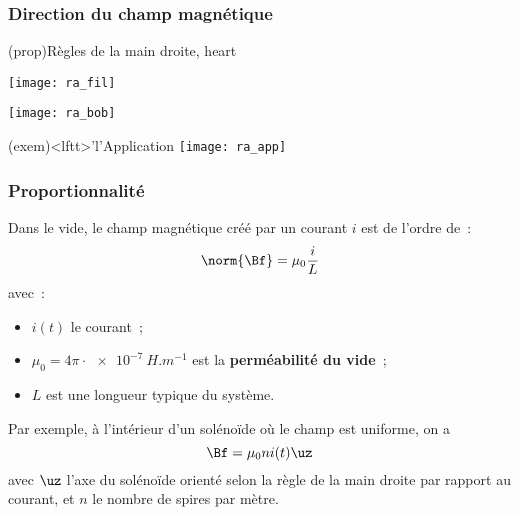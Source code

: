 \documentclass[../../main/main.tex]{subfiles}
\begin{document}
\subsubsection{Direction du champ magnétique}
\label{sssec:chpdir}
\begin{tcb}(prop){Règles de la main droite, heart}
	\begin{minipage}[t]{.45\linewidth}
		\begin{center}
			\texttt{[image: ra\_fil]}
			\label{fig:rafil}
		\end{center}
	\end{minipage}
	\hfill
	\begin{minipage}[t]{.45\linewidth}
		\begin{center}
			\texttt{[image: ra\_bob]}
			\label{fig:rabob}
		\end{center}
	\end{minipage}
\end{tcb}
\begin{tcb}(exem)<lftt>'l'{Application}
	\centering
	\texttt{[image: ra\_app]}
\end{tcb}

\subsubsection{Proportionnalité}
\label{sssec:prop}
Dans le vide, le champ magnétique créé par un courant $i$ est de l'ordre de~:
\[
	\norm{\Bf} = \mu_0 \frac{i}{L}
\]
avec~:
\begin{itemize}
	\item $i (t)$ le courant~;
	\item $\mu_0 = 4\pi\cdot \SI{e-7}{H.m ^{-1}}$ est la \textbf{perméabilité du
		      vide}~;
	\item $L$ est une longueur typique du système.
\end{itemize}
Par exemple, à l'intérieur d'un solénoïde où le champ est uniforme, on a
\[
	\Bf = \mu_0ni (t)\uz
\]
avec $\uz$ l'axe du solénoïde orienté selon la règle de la main droite par
rapport au courant, et $n$ le nombre de spires par mètre.
\end{document}

